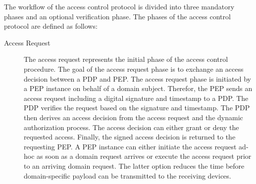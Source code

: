 The workflow of the access control protocol is divided into three mandatory phases and an optional verification phase.
The phases of the access control protocol are defined as follows:
\begin{description}
    \item[Access Request] The access request represents the initial phase of the access control procedure.
    The goal of the access request phase is to exchange an access decision between a PDP and PEP.
    The access request phase is initiated by a PEP instance on behalf of a domain subject.
    Therefor, the PEP sends an access request including a digital signature and timestamp to a PDP.
    The PDP verifies the request based on the signature and timestamp.
    The PDP then derives an access decision from the access request and the dynamic authorization process.
    The access decision can either grant or deny the requested access.
    Finally, the signed access decision is returned to the requesting PEP.
    A PEP instance can either initiate the access request ad-hoc as soon as a domain request arrives or execute the access request prior to an arriving domain request.
    The latter option reduces the time before domain-specific payload can be transmitted to the receiving devices.


\end{description}
